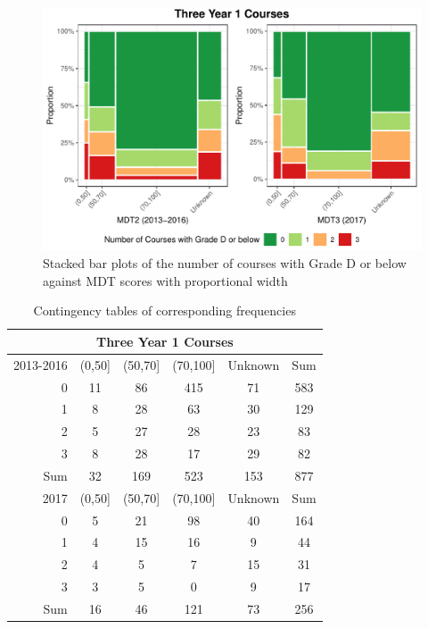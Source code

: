 \documentclass[a4paper]{report}
\begin{document}
\begin{figure}[H]
  \centering
  \includegraphics[width=\linewidth]{fig/REL_Y1Fs_vs_MDT_5070.pdf}
  \caption{\label{fig:REL_Y1Fs_vs_MDT_5070}Stacked bar plots of the number of courses with Grade D or below against MDT scores with proportional width}
\end{figure}

\begin{table}[ht]
  \centering
  \begin{tabular}{r|cccc|c}
    \hline
    \multicolumn{6}{c}{\textbf{Three Year 1 Courses}} \\
    \hline
  2013-2016 & (0,50] & (50,70] & (70,100] & Unknown & Sum \\ 
  \hline
  0 & 11 & 86 & 415 & 71 & 583 \\ 
    1 & 8 & 28 & 63 & 30 & 129 \\ 
    2 & 5 & 27 & 28 & 23 & 83 \\ 
    3 & 8 & 28 & 17 & 29 & 82 \\ 
    \hline
    Sum & 32 & 169 & 523 & 153 & 877 \\ 
     \hline
     \hline
    2017 & (0,50] & (50,70] & (70,100] & Unknown & Sum \\ 
    \hline
  0 & 5 & 21 & 98 & 40 & 164 \\ 
    1 & 4 & 15 & 16 & 9 & 44 \\ 
    2 & 4 & 5 & 7 & 15 & 31 \\ 
    3 & 3 & 5 & 0 & 9 & 17 \\ 
    \hline
    Sum & 16 & 46 & 121 & 73 & 256 \\ 
    \hline
  \end{tabular}
  \caption{\label{tab:REL_Y1Fs_vs_MDT_5070}Contingency tables of corresponding frequencies}
\end{table}
\end{document}
